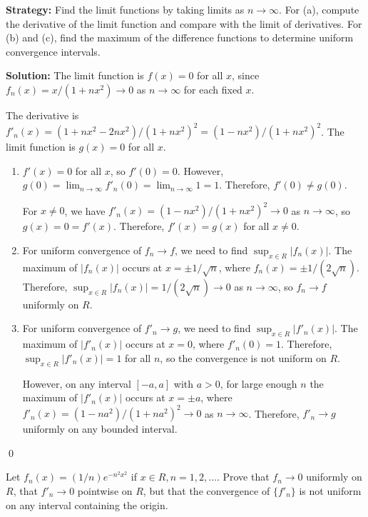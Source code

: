 \noindent\textbf{Strategy:} Find the limit functions by taking limits as \( n \to \infty \). For (a), compute the derivative of the limit function and compare with the limit of derivatives. For (b) and (c), find the maximum of the difference functions to determine uniform convergence intervals.

\bigskip\noindent\textbf{Solution:} The limit function is \( f(x) = 0 \) for all \( x \), since \( f_n(x) = x/(1 + nx^2) \to 0 \) as \( n \to \infty \) for each fixed \( x \).

The derivative is \( f'_n(x) = (1 + nx^2 - 2nx^2)/(1 + nx^2)^2 = (1 - nx^2)/(1 + nx^2)^2 \). The limit function is \( g(x) = 0 \) for all \( x \).

\begin{enumerate}[label=(\alph*)]
\item \( f'(x) = 0 \) for all \( x \), so \( f'(0) = 0 \). However, \( g(0) = \lim_{n \to \infty} f'_n(0) = \lim_{n \to \infty} 1 = 1 \). Therefore, \( f'(0) \neq g(0) \).

For \( x \neq 0 \), we have \( f'_n(x) = (1 - nx^2)/(1 + nx^2)^2 \to 0 \) as \( n \to \infty \), so \( g(x) = 0 = f'(x) \). Therefore, \( f'(x) = g(x) \) for all \( x \neq 0 \).

\item For uniform convergence of \( f_n \to f \), we need to find \( \sup_{x \in R} |f_n(x)| \). The maximum of \( |f_n(x)| \) occurs at \( x = \pm 1/\sqrt{n} \), where \( f_n(x) = \pm 1/(2\sqrt{n}) \). Therefore, \( \sup_{x \in R} |f_n(x)| = 1/(2\sqrt{n}) \to 0 \) as \( n \to \infty \), so \( f_n \to f \) uniformly on \( R \).

\item For uniform convergence of \( f'_n \to g \), we need to find \( \sup_{x \in R} |f'_n(x)| \). The maximum of \( |f'_n(x)| \) occurs at \( x = 0 \), where \( f'_n(0) = 1 \). Therefore, \( \sup_{x \in R} |f'_n(x)| = 1 \) for all \( n \), so the convergence is not uniform on \( R \).

However, on any interval \([-a, a]\) with \( a > 0 \), for large enough \( n \) the maximum of \( |f'_n(x)| \) occurs at \( x = \pm a \), where \( f'_n(x) = (1 - na^2)/(1 + na^2)^2 \to 0 \) as \( n \to \infty \). Therefore, \( f'_n \to g \) uniformly on any bounded interval.
\end{enumerate}\qed


\begin{problembox}
Let \( f_n(x) = (1/n)e^{-n^2x^2} \) if \( x \in R, n = 1, 2, \ldots \). Prove that \( f_n \to 0 \) uniformly on \( R \), that \( f'_n \to 0 \) pointwise on \( R \), but that the convergence of \(\{f'_n\}\) is not uniform on any interval containing the origin.
\end{problembox}

